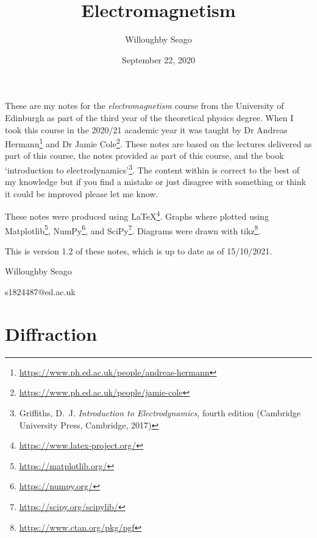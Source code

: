 \documentclass[a4paper]{article}
\author{Willoughby Seago}
\date{September 22, 2020}
\title{Electromagnetism}
\newcommand{\notesVersion}{1.2}
\newcommand{\notesDate}{15/10/2021}
\begin{document}
    \maketitle
    These are my notes for the \textit{electromagnetism} course from the University of Edinburgh as part of the third year of the theoretical physics degree.
    When I took this course in the 2020/21 academic year it was taught by Dr Andreas Hermann\footnote{\url{https://www.ph.ed.ac.uk/people/andreas-hermann}} and Dr Jamie Cole\footnote{\url{https://www.ph.ed.ac.uk/people/jamie-cole}}.
    These notes are based on the lectures delivered as part of this course, the notes provided as part of this course, and the book `introduction to electrodynamics'\footnote{Griffiths, D.~J. \textit{Introduction to Electrodynamics}, fourth edition (Cambridge University Press, Cambridge, 2017)}.
    The content within is correct to the best of my knowledge but if you find a mistake or just disagree with something or think it could be improved please let me know.
    
    These notes were produced using \LaTeX\footnote{\url{https://www.latex-project.org/}}.
    Graphs where plotted using Matplotlib\footnote{\url{https://matplotlib.org/}}, NumPy\footnote{\url{https://numpy.org/}}, and SciPy\footnote{\url{https://scipy.org/scipylib/}}.
    Diagrams were drawn with tikz\footnote{\url{https://www.ctan.org/pkg/pgf}}.
    
    This is version \notesVersion{} of these notes, which is up to date as of \notesDate.
    \begin{flushright}
        Willoughby Seago
        
        s1824487@ed.ac.uk
    \end{flushright}
    \clearpage
    \tableofcontents
    \listoffigures
    \printglossary[type=\acronymtype, title=Acronyms, style=long]
    \clearpage
    \begingroup
    \let\clearpage\relax  %
    
    
    
    
    
    
    \endgroup
    
    \part{Diffraction}
\end{document}

